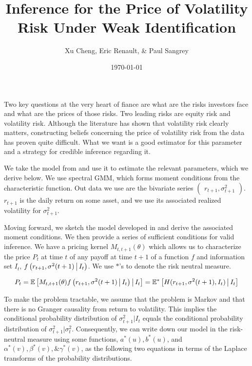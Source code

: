 \documentclass[11pt]{article}
\author{Xu Cheng, Eric Renault, \& Paul Sangrey}
\title{Inference for the Price of Volatility Risk Under Weak Identification}
\date{\today}
\newcommand*{\E}{\mathbb{E}}
\newcommand{\mvert}[1][\middle]{\ensuremath{\,#1\vert\,}}
\begin{document}
\maketitle

Two key questions at the very heart of fiance are what are the risks investors face and what are the prices of
those risks.
Two leading risks are equity risk and volatility risk.
Although the literature has shown that volatility risk clearly matters, constructing beliefs concerning the price
of volatility risk from the data has proven quite difficult.
What we want is a good estimator for this parameter and a strategy for credible inference regarding it.  

We take the model from \textcite{khrapov2016affine} and use it to estimate the relevant
parameters, which we derive below. 
We use spectral GMM, which forms moment conditions from the characteristic function.
Out data we use are the bivariate series $\begin{pmatrix} r_{t+1}, \sigma^2_{t+1} \end{pmatrix}$.
$r_{t+1}$ is the daily return on some asset, and we use its associated realized volatility for $\sigma^2_{t+1}$.

Moving forward, we sketch the model developed in \textcite{khrapov2016affine} and derive the associated moment
conditions.
We then provide a series of sufficient conditions for valid inference. 
We have a pricing kernel $M_{t, t+1}(\theta)$ which allows us to characterize the price $P_t$ at time $t$ of any
payoff at time $t+1$ of a function $f$ and information set $I_t$, $f\left(r_{t+1}, \sigma^2(t+1) \mvert
I_t\right)$. 
We use $*$'s to denote the risk neutral measure.

\begin{equation}
    P_t  = \E\left[M_{t,t+1}(\theta) f\left(r_{t+1}, \sigma^2(t+1) \mvert  I_t\right) \mvert I_t \right] =
    \E^{*}\left[H(r_{t+1}, \sigma^2(t+1),  I_t) \mvert I_t \right] 
\end{equation}


To make the problem tractable, we assume that the problem is Markov and that there is no Granger causality from
return to volatility. 
This implies the conditional probability distribution of $\sigma^2_{t+1} \vert I_t$ equals the conditional
probability distribution of $\sigma^2_{t+1} \vert \sigma^2_t$.
Consequently, we can write down our model in the risk-neutral measure using some functions, $a^{*}(u), b^{*}(u)$,
and $\alpha^{*}(v), \beta^{*}(v), \& \gamma^{*}(v)$, as the following two equations in terms of the Laplace
transforms of the probability distributions.
\end{document}
